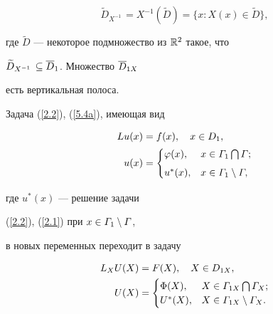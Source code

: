 $$


\widetilde{D}_{X^{-1}\,}=X^{-1}(\widetilde{D})=\{x: X(x)\in


\widetilde{D}\},


$$


где $\widetilde{D}$ --- некоторое подмножество из $\Bbb R^2$ такое, что


$\widetilde{D}_{X^{-1}}\,\subseteq \overline{D}_1$. Множество $\overline{D}_{1X}$


есть вертикальная полоса.





Задача (\ref{2.2}), (\ref{5.4a}), имеющая вид


\begin{equation} \label{7.2}


\begin{split}


L u(x) &= f(x), \quad 


x\in D_{1}, \\


u(x)&=


\begin{cases}


\vf(x), & x\in \G_{1}\bigcap \G;\\[1ex]


u^*(x), & x\in \G_{1}\setminus \G,


\end{cases}


\end{split}


\end{equation}


где $u^*(x)$ --- решение задачи


(\ref{2.2}), (\ref{2.1}) при $x\in \varGamma_{1}\setminus \varGamma$,


в новых переменных переходит в задачу


\begin{equation} \label{7.3}


\begin{split}


L_X U(X) &= F(X), \quad 


X\in D_{1X}, \\


U(X)&=


\begin{cases}


\Phi(X), & X\in \G_{1X}\bigcap \G_X; \\


U^*(X), & X\in \G_{1X}\setminus \G_X.


\end{cases}


\end{split}


\end{equation}


